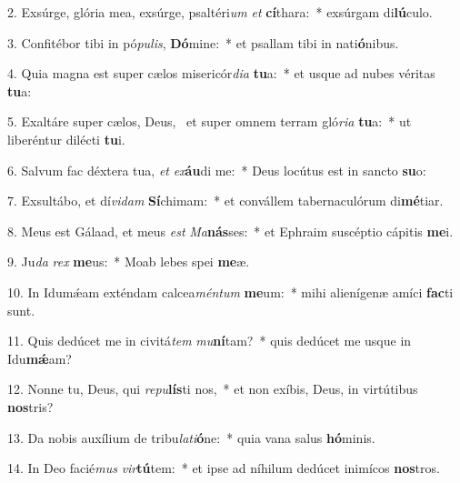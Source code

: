 2. Exsúrge, glória mea, exsúrge, psaltéri\textit{um} \textit{et} \textbf{cí}thara:~*  exsúrgam di\textbf{lú}culo.\

3. Confitébor tibi in pó\textit{pu}\textit{lis}, \textbf{Dó}mine:~*  et psallam tibi in nati\textbf{ó}nibus.\

4. Quia magna est super cælos misericór\textit{di}\textit{a} \textbf{tu}a:~*  et usque ad nubes véritas \textbf{tu}a:\

5. Exaltáre super cælos, Deus, \dag\  et super omnem terram gló\textit{ri}\textit{a} \textbf{tu}a:~*  ut liberéntur dilécti \textbf{tu}i.\

6. Salvum fac déxtera tua, \textit{et} \textit{ex}\textbf{áu}di me:~*  Deus locútus est in sancto \textbf{su}o:\

7. Exsultábo, et dí\textit{vi}\textit{dam} \textbf{Sí}chimam:~*  et convállem tabernaculórum di\textbf{mé}tiar.\

8. Meus est Gálaad, et meus \textit{est} \textit{Ma}\textbf{nás}ses:~*  et Ephraim suscéptio cápitis \textbf{me}i.\

9. Ju\textit{da} \textit{rex} \textbf{me}us:~*  Moab lebes spei \textbf{me}æ.\

10. In Idumǽam exténdam calcea\textit{mén}\textit{tum} \textbf{me}um:~*  mihi alienígenæ amíci \textbf{fac}ti sunt.\

11. Quis dedúcet me in civitá\textit{tem} \textit{mu}\textbf{ní}tam?~*  quis dedúcet me usque in Idu\textbf{mǽ}am?\

12. Nonne tu, Deus, qui \textit{re}\textit{pu}\textbf{lís}ti nos,~*  et non exíbis, Deus, in virtútibus \textbf{nos}tris?\

13. Da nobis auxílium de tribu\textit{la}\textit{ti}\textbf{ó}ne:~*  quia vana salus \textbf{hó}minis.\

14. In Deo facié\textit{mus} \textit{vir}\textbf{tú}tem:~*  et ipse ad níhilum dedúcet inimícos \textbf{nos}tros.\

